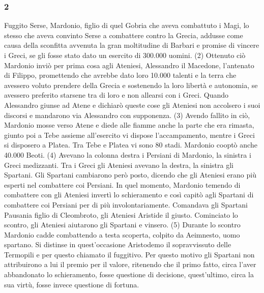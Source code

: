 \subsubsection*{2} Fuggito Serse, Mardonio, figlio di quel Gobria che aveva combattuto i Magi, lo stesso che aveva convinto Serse a combattere contro la Grecia, addusse come causa della sconfitta avvenuta la gran moltitudine di Barbari e promise di vincere i Greci, se gli fosse stato dato un esercito di 300.000 uomini. (2) Ottenuto ciò Mardonio inviò per prima cosa agli Ateniesi, Alessandro il Macedone, l'antenato di Filippo, promettendo che avrebbe dato loro 10.000 talenti e la terra che avessero voluto prendere della Grecia e sostenendo la loro libertà e autonomia, se avessero preferito starsene tra di loro e non allearsi con i Greci. Quando Alessandro giunse ad Atene e dichiarò queste cose gli Ateniesi non accolsero i suoi discorsi e mandarono via Alessandro con supponenza. (3) Avendo fallito in ciò, Mardonio mosse verso Atene e diede alle fiamme anche la parte che era rimasta, giunto poi a Tebe assieme all'esercito vi dispose l'accampamento, mentre i Greci si disposero a Platea. Tra Tebe e Platea vi sono 80 stadi. Mardonio cooptò anche 40.000 Beoti. (4) Avevano la colonna destra i Persiani di Mardonio, la sinistra i Greci medizzanti. Tra i Greci gli Ateniesi avevano la destra, la sinistra gli Spartani. Gli Spartani cambiarono però posto, dicendo che gli Ateniesi erano più esperti nel combattere coi Persiani. In quel momento, Mardonio temendo di combattere con gli Ateniesi invertì lo schieramento e così capitò agli Spartani di combattere coi Persiani per di più involontariamente. Comandava gli Spartani Pausania figlio di Cleombroto, gli Ateniesi Aristide il giusto. Cominciato lo scontro, gli Ateniesi aiutarono gli Spartani e vinsero. (5) Durante lo scontro Mardonio cadde combattendo a testa scoperta, colpito da Aeimnesto, uomo spartano. Si distinse in quest'occasione Aristodemo il sopravvissuto delle Termopili e per questo chiamato il fuggitivo. Per questo motivo gli Spartani non attribuirono a lui il premio per il valore, ritenendo che il primo fatto, circa l'aver abbandonato lo schieramento, fosse questione di decisione, quest'ultimo, circa la sua virtù, fosse invece questione di fortuna.

